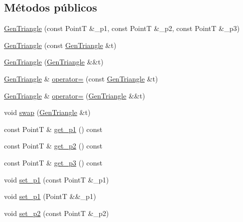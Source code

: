 \subsection*{Métodos públicos}
\begin{DoxyCompactItemize}
\item 
\hyperlink{class_designar_1_1_gen_triangle_abcdb0045637f2ee8b34cf674fc619e04}{Gen\+Triangle} (const PointT \&\+\_\+p1, const PointT \&\+\_\+p2, const PointT \&\+\_\+p3)
\item 
\hyperlink{class_designar_1_1_gen_triangle_a7308aa4e23c9efb2c76d852a96720e46}{Gen\+Triangle} (const \hyperlink{class_designar_1_1_gen_triangle}{Gen\+Triangle} \&t)
\item 
\hyperlink{class_designar_1_1_gen_triangle_a0088e354dd40c4391e291ae02d7ff873}{Gen\+Triangle} (\hyperlink{class_designar_1_1_gen_triangle}{Gen\+Triangle} \&\&t)
\item 
\hyperlink{class_designar_1_1_gen_triangle}{Gen\+Triangle} \& \hyperlink{class_designar_1_1_gen_triangle_ad478eec7295a0823d1061e471e6c5527}{operator=} (const \hyperlink{class_designar_1_1_gen_triangle}{Gen\+Triangle} \&t)
\item 
\hyperlink{class_designar_1_1_gen_triangle}{Gen\+Triangle} \& \hyperlink{class_designar_1_1_gen_triangle_a5c59bfbd92a3114bb243d187d33e46d1}{operator=} (\hyperlink{class_designar_1_1_gen_triangle}{Gen\+Triangle} \&\&t)
\item 
void \hyperlink{class_designar_1_1_gen_triangle_a56928ea4b8436fb98654c791121d5abe}{swap} (\hyperlink{class_designar_1_1_gen_triangle}{Gen\+Triangle} \&t)
\item 
const PointT \& \hyperlink{class_designar_1_1_gen_triangle_ab697f342f213f563049c9f74fcee06a1}{get\+\_\+p1} () const
\item 
const PointT \& \hyperlink{class_designar_1_1_gen_triangle_a77a549a6f5c67ab61298395606f920fa}{get\+\_\+p2} () const
\item 
const PointT \& \hyperlink{class_designar_1_1_gen_triangle_a56dbe16bc096232f2bcc6f95c2e464df}{get\+\_\+p3} () const
\item 
void \hyperlink{class_designar_1_1_gen_triangle_ac00304297a565c88d5f1ab663f00259f}{set\+\_\+p1} (const PointT \&\+\_\+p1)
\item 
void \hyperlink{class_designar_1_1_gen_triangle_af6834f2d91ca020c2cebedc990e9db5d}{set\+\_\+p1} (PointT \&\&\+\_\+p1)
\item 
void \hyperlink{class_designar_1_1_gen_triangle_a866c788d9a7f7cb8c4bde20ceb149408}{set\+\_\+p2} (const PointT \&\+\_\+p2)

\end{DoxyCompactItemize}
